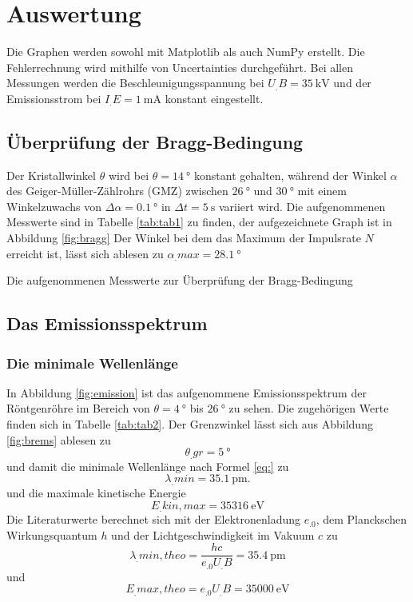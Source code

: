 \section{Auswertung}
\label{sec:Auswertung}


Die Graphen werden sowohl mit Matplotlib \cite{matplotlib} als auch NumPy \cite{numpy} erstellt. Die Fehlerrechnung wird mithilfe von Uncertainties \cite{uncertainties} durchgeführt.
Bei allen Messungen werden die Beschleunigungsspannung bei $U_.B=\SI{35}{\kilo\volt}$ und der Emissionsstrom bei $I_.E=\SI{1}{\milli\ampere}$ konstant eingestellt.

\subsection{Überprüfung der Bragg-Bedingung}
Der Kristallwinkel $\theta$ wird bei $\theta= \SI{14}{\degree}$ konstant gehalten, während der Winkel $\alpha$ des Geiger-Müller-Zählrohrs (GMZ) zwischen $\SI{26}{\degree}$ und $\SI{30}{\degree}$ mit einem Winkelzuwachs von $\Delta \alpha = \SI{0,1}{\degree}$ in $\Delta t = \SI{5}{\second}$ variiert wird.
Die aufgenommenen Messwerte sind in Tabelle \ref{tab:tab1} zu finden, der aufgezeichnete Graph ist in Abbildung \ref{fig:bragg}
Der Winkel bei dem das Maximum der Impulsrate $N$ erreicht ist, lässt sich ablesen zu $\alpha_.{max}=\SI{28,1}{\degree}$

\begin{table}
\centering
\caption{Die aufgenommenen Messwerte zur Überprüfung der Bragg-Bedingung}

\label{tab:tab1}
\end{table}

\subsection{Das Emissionsspektrum}
\subsubsection{Die minimale Wellenlänge}
In Abbildung \ref{fig:emission} ist das aufgenommene Emissionsspektrum der Röntgenröhre im Bereich von $\theta=\SI{4}{\degree}$ bis $\SI{26}{\degree}$ zu sehen. Die zugehörigen Werte finden sich in Tabelle \ref{tab:tab2}.
Der Grenzwinkel lässt sich aus Abbildung \ref{fig:brems} ablesen zu 
\[\theta_.{gr}=\SI{5}{\degree}\]
und damit die minimale Wellenlänge nach Formel \eqref{eq:} zu
\[
\lambda_.{min}=\SI{35,1}{\pico\metre}\text{.}
\]
und die maximale kinetische Energie 
\[
E_.{kin,max}=\SI{35316}{\eV}
\] 
Die Literaturwerte berechnet sich mit der Elektronenladung $e_.0$, dem Planckschen Wirkungsquantum $h$ und der Lichtgeschwindigkeit im Vakuum $c$ zu
\[
\lambda_.{min,theo}=\frac{hc}{e_.0U_.B}=\SI{35,4}{\pico\metre}
\]
und
\[
E_.{max,theo}=e_.0U_.B=\SI{35000}{\eV}
\]


